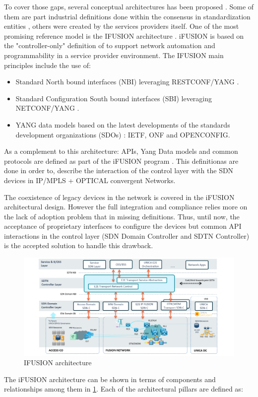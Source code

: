 \documentclass[a4paper,fleqn]{cas-dc}
\begin{document}
To cover those gaps, several conceptual architectures has been proposed \cite{vissicchio2014opportunities,vissicchio2017safe}. Some of them are part industrial definitions done within the consensus in standardization entities \cite{lee2015requirements}, others were created by the services providers itself. One of the most promising reference model is the \uppercase{iFUSION} architecture \cite{contreras2019ifusion}. iFUSION is based on the "controller-only" definition of \cite{sinha2017survey} to support network automation and programmability in a service provider environment. The \uppercase{iFUSION} main principles include the use of:
\begin{itemize}
    \item Standard North bound interfaces (NBI) leveraging \uppercase{RESTconf/YANG} \cite{bierman2017restconf}.
    \item Standard Configuration South bound interfaces (SBI) leveraging \uppercase{NETCONF/YANG} \cite{enns2011network}.
    \item YANG data models based on the latest developments of the standards development organizations (SDOs) \cite{bjorklund2016yang}: \uppercase{IETF}, \uppercase{ONF} and \uppercase{OpenConfig}.
\end{itemize}

As a complement to this architecture: APIs, Yang Data models and common protocols are defined as part of the i\uppercase{FUSION} program \cite{apistelefonica}. This definitionas are done in order to, describe the interaction of the control layer with the SDN devices in IP/MPLS + OPTICAL convergent Networks. 

The coexistence of legacy devices in the network is covered in the iFUSION architectural design. However the full integration and compliance relies more on the lack of adoption problem that in missing definitions.  Thus, until now, the acceptance of proprietary interfaces to configure the devices but common API interactions in the control layer (SDN Domain Controller and SDTN Controller) is the accepted solution to handle this drawback.

\begin{figure}
	\centering
		\includegraphics[width=\linewidth]{figs/ifusion_architecture.png}
	\caption{\uppercase{iFUSION} architecture}
	\label{FIG:1}
\end{figure}
The i\uppercase{FUSION} architecture can be shown in terms of components and relationships among them in \cref{FIG:1}. Each of the architectural pillars are defined as:
\end{document}
